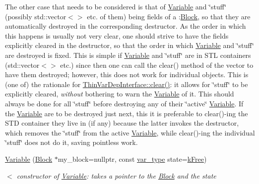 \begin{Indent}
{The other case that needs to be considered is that of \mbox{\hyperlink{class_s_m_spp__di__unipi__it_1_1_variable}{Variable}} and \char`\"{}stuff\char`\"{} (possibly std\+::vector$<$$>$ etc. of them) being fields of a \+:\mbox{\hyperlink{class_s_m_spp__di__unipi__it_1_1_block}{Block}}, so that they are automatically destroyed in the corresponding destructor. As the order in which this happens is usually not very clear, one should strive to have the fields explicitly cleared in the destructor, so that the order in which \mbox{\hyperlink{class_s_m_spp__di__unipi__it_1_1_variable}{Variable}} and \char`\"{}stuff\char`\"{} are destroyed is fixed. This is simple if \mbox{\hyperlink{class_s_m_spp__di__unipi__it_1_1_variable}{Variable}} and \char`\"{}stuff\char`\"{} are in S\+TL containers (std\+::vector$<$$>$ etc.) since then one can call the clear() method of the vector to have them destroyed; however, this does not work for individual objects. This is (one of) the rationale for \mbox{\hyperlink{group___thin_var_dep_interface___c_l_a_s_s_e_s_gae16067de85b435fac4ce8558b193a99a}{Thin\+Var\+Dep\+Interface\+::clear()}}\+: it allows for \char`\"{}stuff\char`\"{} to be explicitly cleared, {\itshape without} bothering to warn the \mbox{\hyperlink{class_s_m_spp__di__unipi__it_1_1_variable}{Variable}} of it. This should always be done for all \char`\"{}stuff\char`\"{} before destroying any of their \char`\"{}active\char`\"{} \mbox{\hyperlink{class_s_m_spp__di__unipi__it_1_1_variable}{Variable}}. If the \mbox{\hyperlink{class_s_m_spp__di__unipi__it_1_1_variable}{Variable}} are to be destroyed just next, this it is preferable to clear()-\/ing the S\+TD container they live in (if any) because the latter invokes the destructor, which removes the \char`\"{}stuff\char`\"{} from the active \mbox{\hyperlink{class_s_m_spp__di__unipi__it_1_1_variable}{Variable}}, while clear()-\/ing the individual \char`\"{}stuff\char`\"{} does not do it, saving pointless work. }\begin{DoxyCompactItemize}
\item 
\mbox{\hyperlink{class_s_m_spp__di__unipi__it_1_1_variable_a5ffe87cf9123af2ebdcfb8c97be2f34b}{Variable}} (\mbox{\hyperlink{class_s_m_spp__di__unipi__it_1_1_block}{Block}} $\ast$my\+\_\+block=nullptr, const \mbox{\hyperlink{class_s_m_spp__di__unipi__it_1_1_variable_a32378add5594ab0f1fb45e711d88924d}{var\+\_\+type}} state=\mbox{\hyperlink{class_s_m_spp__di__unipi__it_1_1_variable_a30febf04ce89c19659143fa83ae6f7baa215574cae9a84b3151d2fb68d4c4d9d1}{k\+Free}})
\begin{DoxyCompactList}\small\item\em $<$ constructor of \mbox{\hyperlink{class_s_m_spp__di__unipi__it_1_1_variable}{Variable}}\+: takes a pointer to the \mbox{\hyperlink{class_s_m_spp__di__unipi__it_1_1_block}{Block}} and the state \end{DoxyCompactList}\item 

\end{DoxyCompactItemize}
\end{Indent}
